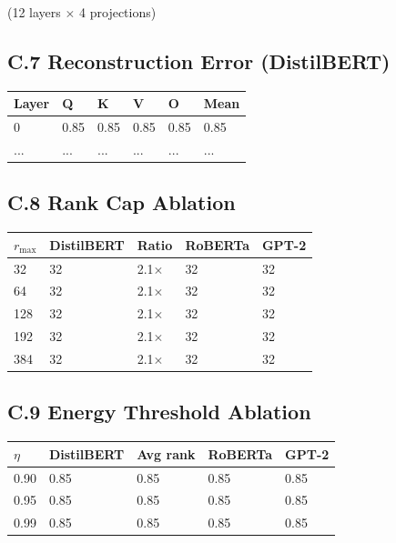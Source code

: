 (12 layers $\times$ 4 projections)

\subsection{C.7 Reconstruction Error (DistilBERT)}

\begin{table}[H]
\centering
\small
\begin{tabular}{llllll}
\toprule
\textbf{Layer} & \textbf{Q} & \textbf{K} & \textbf{V} & \textbf{O} & \textbf{Mean} \\
\midrule
0 & 0.85 & 0.85 & 0.85 & 0.85 & 0.85 \\
... & ... & ... & ... & ... & ... \\
\bottomrule
\end{tabular}
\end{table}

\subsection{C.8 Rank Cap Ablation}

\begin{table}[H]
\centering
\small
\begin{tabular}{lllll}
\toprule
\textbf{$r_\text{max}$} & \textbf{DistilBERT} & \textbf{Ratio} & \textbf{RoBERTa} & \textbf{GPT-2} \\
\midrule
32 & 32 & 2.1$\times$ & 32 & 32 \\
64 & 32 & 2.1$\times$ & 32 & 32 \\
128 & 32 & 2.1$\times$ & 32 & 32 \\
192 & 32 & 2.1$\times$ & 32 & 32 \\
384 & 32 & 2.1$\times$ & 32 & 32 \\
\bottomrule
\end{tabular}
\end{table}

\subsection{C.9 Energy Threshold Ablation}

\begin{table}[H]
\centering
\small
\begin{tabular}{lllll}
\toprule
\textbf{$\eta$} & \textbf{DistilBERT} & \textbf{Avg rank} & \textbf{RoBERTa} & \textbf{GPT-2} \\
\midrule
0.90 & 0.85 & 0.85 & 0.85 & 0.85 \\
0.95 & 0.85 & 0.85 & 0.85 & 0.85 \\
0.99 & 0.85 & 0.85 & 0.85 & 0.85 \\
\bottomrule
\end{tabular}
\end{table}

